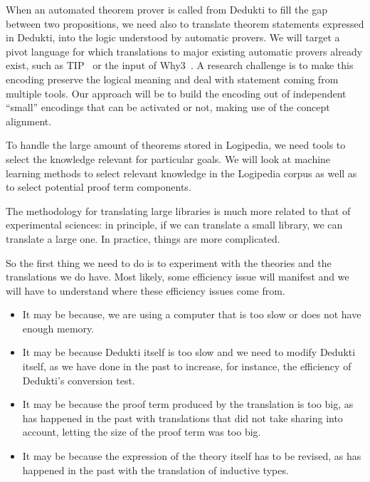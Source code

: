 When an automated theorem prover is called from Dedukti to fill the
gap between two propositions, we need also to translate theorem
statements expressed in Dedukti, into the logic understood by
automatic provers. We will target a pivot language for which
translations to major existing automatic provers already exist, such
as TIP~\cite{DBLP:conf/mkm/ClaessenJRS15} or the input of
Why3~\cite{DBLP:conf/esop/FilliatreP13}. A research challenge is to
make this encoding preserve the logical meaning and deal with
statement coming from multiple tools. Our approach will be to build
the encoding out of independent ``small'' encodings that can be
activated or not, making use of the concept alignment.

To handle the large amount of theorems stored in Logipedia, we need
tools to select the knowledge relevant for particular goals. We will
look at machine learning methods to select relevant knowledge in the
Logipedia corpus as well as to select potential proof term components.


The methodology for translating large libraries is much more related
to that of experimental sciences: in principle, if we can translate a
small library, we can translate a large one. In practice, things are
more complicated.

So the first thing we need to do is to experiment with the theories
and the translations we do have. Most likely, some efficiency issue
will manifest and we will have to understand where these efficiency
issues come from.

\begin{itemize}
\item It may be because, we are using a computer that is too slow or
  does not have enough memory.
\item It may be because Dedukti itself is too slow and we need to modify
  Dedukti itself, as we have done in the past to increase, for instance,
  the efficiency of Dedukti's conversion test.
\item It may be because the proof term produced by the translation is
  too big, as has happened in the past with translations that did not
  take sharing into account, letting the size of the proof term 
  was too big.
\item It may be because the expression of the theory itself has to be
  revised, as has happened in the past with the translation of
  inductive types.
\end{itemize}

